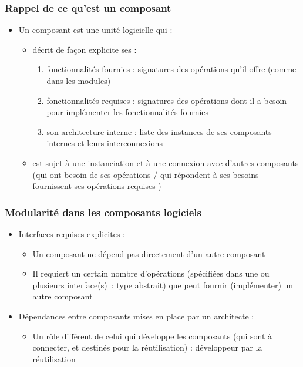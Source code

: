 \documentclass{beamer}
\begin{document}
\begin{frame}
  \frametitle{Rappel de ce qu'est un composant}  
  \begin{itemize}
  \item  Un composant est une unité logicielle qui :
    \begin{itemize}
    \item décrit de façon explicite ses :
    \begin{enumerate}
    \item fonctionnalités fournies : signatures des opérations qu'il offre
(comme dans les modules)
\item fonctionnalités requises : signatures des opérations dont il
	a besoin pour implémenter les fonctionnalités fournies
\item son architecture interne : liste des instances de ses
	composants internes et leurs interconnexions
    \end{enumerate}
\item est sujet à une instanciation et à une connexion avec d'autres
	composants (qui ont besoin de ses opérations / qui répondent
	à ses besoins -fournissent ses opérations requises-)
  \end{itemize}        
  \end{itemize}
\end{frame}

\begin{frame}
  \frametitle{Modularité dans les composants logiciels}  
  \begin{itemize}
  \item  Interfaces requises explicites :
  \begin{itemize}
  \item Un composant ne dépend pas directement d'un autre composant
  \item Il requiert un certain nombre d'opérations (spécifiées dans
    une ou plusieurs interface(s) : type abstrait) que peut fournir
    (implémenter) un autre composant
  \end{itemize}
\item Dépendances entre composants mises en place par un architecte :
  \begin{itemize}
  \item Un rôle différent de celui qui développe les composants (qui
    sont à connecter, et destinés pour la réutilisation) : développeur
    par la réutilisation
  \end{itemize}
\end{itemize}
\end{frame}
\end{document}
